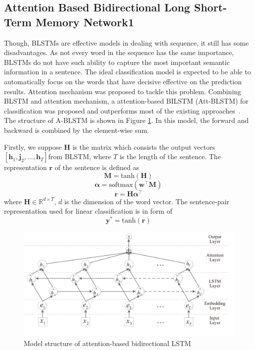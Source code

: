 \subsection{Attention Based Bidirectional Long Short-Term Memory Network1}
Though, BLSTMs are effective models in dealing with sequence, it still has some disadvantages. As not every word in the sequence has the same importance, BLSTMs do not have such ability to capture the most important semantic information in a sentence. The ideal classification model is expected to be able to automatically focus on the words that have decisive effective on the prediction results. Attention mechanism was proposed to tackle this problem. Combining BLSTM and attention mechanism, a attention-based BILSTM (Att-BLSTM) for classification was proposed and outperforms most of the existing approaches~\cite{zhou2016attention}. The structure of A-BLSTM is shown in Figure \ref{attention_blstm}. In this model, the forward and backward is combined by the element-wise sum. 

Firstly, we suppose $\mathbf{H}$ is the matrix which consists the output vectors $[\mathbf{h}_1, \mathbf{j}_2,...,\mathbf{h}_T]$from BLSTM, where $T$ is the length of the sentence. The representation $\mathbf{r}$ of the sentence is defined as 
\begin{equation}
\mathbf{M} = \mbox{tanh}(\mathbf{H})
\end{equation}
\begin{equation}
\mathbf{\alpha} = \mbox{softmax}(\mathbf{w}^{\intercal}\mathbf{M})
\end{equation}
\begin{equation}
\mathbf{r} = \mathbf{H} \mathbf{\alpha} ^\intercal
\end{equation}
where $\mathbf{H} \in \mathbb{R}^{d\times T}$, $d$ is the dimension of the word vector. The sentence-pair representation used for linear classification is in form of
\begin{equation}
\mathbf{y}^* = \mbox{tanh}(\mathbf{r})
\end{equation}

\begin{figure}
\caption{Model structure of attention-based bidirectional LSTM}
\label{attention_blstm}
\centering
\includegraphics{attention_blstm.png}
\end{figure}

